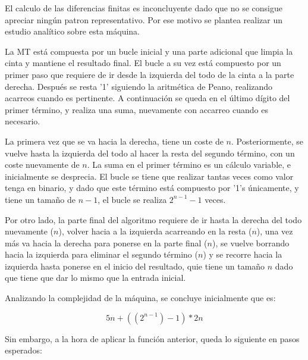 \documentclass{uc3mpracticas}
\begin{document}
  El calculo de las diferencias finitas es inconcluyente dado que no se consigue apreciar ningún patron representativo. Por ese motivo se plantea realizar un estudio analítico sobre esta máquina.

  \vspace{2mm}

  La MT está compuesta por un bucle inicial y una parte adicional que limpia la cinta y mantiene el resultado final. El bucle a su vez está compuesto por un primer paso que requiere de ir desde la izquierda del todo de la cinta a la parte derecha. Después se resta '1' siguiendo la aritmética de Peano, realizando acarreos cuando es pertinente. A continuación se queda en el último dígito del primer término, y realiza una suma, nuevamente con accarreo cuando es necesario.

  \vspace{2mm}

  La primera vez que se va hacia la derecha, tiene un coste de $n$. Posteriormente, se vuelve hasta la izquierda del todo al hacer la resta del segundo término, con un coste nuevamente de $n$. La suma en el primer término es un cálculo variable, e inicialmente se desprecia. El bucle se tiene que realizar tantas veces como valor tenga en binario, y dado que este término está compuesto por '1's únicamente, y tiene un tamaño de $n-1$, el bucle se realiza $2^{n-1}-1$ veces.

  \vspace{2mm}

  Por otro lado, la parte final del algoritmo requiere de ir hasta la derecha del todo nuevamente ($n$), volver hacia a la izquierda acarreando en la resta ($n$), una vez más va hacia la derecha para ponerse en la parte final ($n$), se vuelve borrando hacia la izquierda para eliminar el segundo término ($n$) y se recorre hacia la izquierda hasta ponerse en el inicio del resultado, quie tiene un tamaño $n$ dado que tiene que dar lo mismo que la entrada inicial.

  \vspace{2mm}


  Analizando la complejidad de la máquina, se concluye inicialmente que es:

  $$5n + ((2^{n-1}) - 1) * 2n$$



    Sin embargo, a la hora de aplicar la función anterior, queda lo siguiente en pasos esperados:
\end{document}
